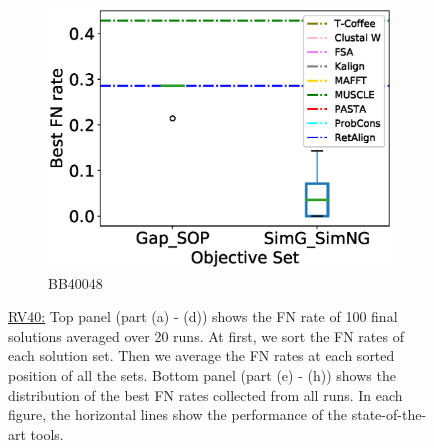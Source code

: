 \begin{figure}[!htbp]
\begin{adjustwidth}{-1.5cm}{-1cm}
\begin{subfigure}{0.22\textwidth}
			\includegraphics[width=\columnwidth]{Figure/summary/precomputedInit/Balibase/BB40048_objset_fnrate_rank}
			\caption{BB40048}
		\end{subfigure}
		\end{adjustwidth}
		\caption[FN rate results on RV40]{\underline{RV40:} Top panel (part (a) - (d)) shows the FN rate of 100 final solutions averaged over 20 runs. At first, we sort the FN rates of each solution set. Then we average the FN rates at each sorted position of all the sets. Bottom panel (part (e) - (h)) shows the distribution of the best FN rates collected from all runs. In each figure, the horizontal lines show the performance of the state-of-the-art tools.}
		\label{fig:rv40_fn_rate}

\end{figure}


